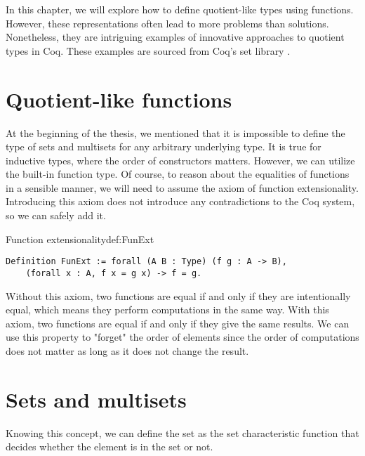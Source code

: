 In this chapter, we will explore how to define quotient-like types using functions. However, these representations often lead to more problems than solutions. Nonetheless, they are intriguing examples of innovative approaches to quotient types in Coq. These examples are sourced from Coq's set library \cite{coqDoc}. %
\section{Quotient-like functions}
At the beginning of the thesis, we mentioned that it is impossible to define the type of sets and multisets for any arbitrary underlying type. It is true for inductive types, where the order of constructors matters. However, we can utilize the built-in function type. Of course, to reason about the equalities of functions in a sensible manner, we will need to assume the axiom of function extensionality. Introducing this axiom does not introduce any contradictions to the Coq system, so we can safely add it.
\begin{defi}{Function extensionality}{def:FunExt}
\begin{verbatim}
Definition FunExt := forall (A B : Type) (f g : A -> B),
    (forall x : A, f x = g x) -> f = g.
\end{verbatim}
\end{defi}
Without this axiom, two functions are equal if and only if they are intentionally equal, which means they perform computations in the same way. With this axiom, two functions are equal if and only if they give the same results. We can use this property to "forget" the order of elements since the order of computations does not matter as long as it does not change the result.

\section{Sets and multisets}
Knowing this concept, we can define the set as the set characteristic function that decides whether the element is in the set or not.

